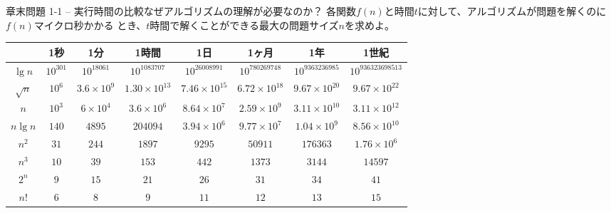 \documentclass[unicode,11pt,aspectratio=169,hide notes]{beamer} %
\begin{document}

\begin{frame}{章末問題 1-1 -- 実行時間の比較}{なぜアルゴリズムの理解が必要なのか？}
  各関数$f(n)$と時間$t$に対して、アルゴリズムが問題を解くのに$f(n)$マイクロ秒かかる
  とき、$t$時間で解くことができる最大の問題サイズ$n$を求めよ。

  {\scriptsize \begin{center}
    \begin{tabular}{|c|c|c|c|c|c|c|c|}
      \hline
      & 1秒 & 1分 & 1時間 & 1日 & 1ヶ月 & 1年 & 1世紀 \\ \hline
      $\lg n$ & $10^{301}$ & $10^{18061}$ & $10^{1083707}$ & $10^{26008991}$ &
        $10^{78 0269748}$ & $10^{9363236985}$ & $10^{936323698513}$ \\ \hline
      $\sqrt{n}$ & $10^6$ & $3.6\times 10^9$ & $1.30 \times 10^{13}$ &
        $7.46 \times 10^{15}$ & $6.72 \times 10^{18}$ & $9.67 \times 10^{20}$ &
        $9.67 \times 10^{22}$ \\ \hline
      $n$ & $10^3$ & $6 \times 10^4$ & $3.6 \times 10^6$ & $8.64 \times 10^7$ &
        $2.59 \times 10^9$ & $3.11 \times 10^{10}$ & $3.11 \times 10^{12}$
        \\ \hline
      $n\lg n$ & $140$ & $4895$ & $204094$ & $3.94 \times 10^6$ &
        $9.77 \times 10^7$ & $1.04 \times 10^9$ & $8.56 \times 10^{10}$
        \\ \hline
      $n^2$ & $31$ & $244$ & $1897$ & $9295$ & $50911$ & $176363$ &
        $1.76 \times 10^6$ \\ \hline
      $n^3$ & $10$ & $39$ & $153$ & $442$ & $1373$ & $3144$ & $14597$ \\ \hline
      $2^n$ & $9$ & $15$ & $21$ & $26$ & $31$ & $34$ & $41$ \\ \hline
      $n!$ & $6$ & $8$ & $9$ & $11$ & $12$ & $13$ & $15$ \\
      \hline
    \end{tabular}
  \end{center}}
\end{frame}
\end{document}
